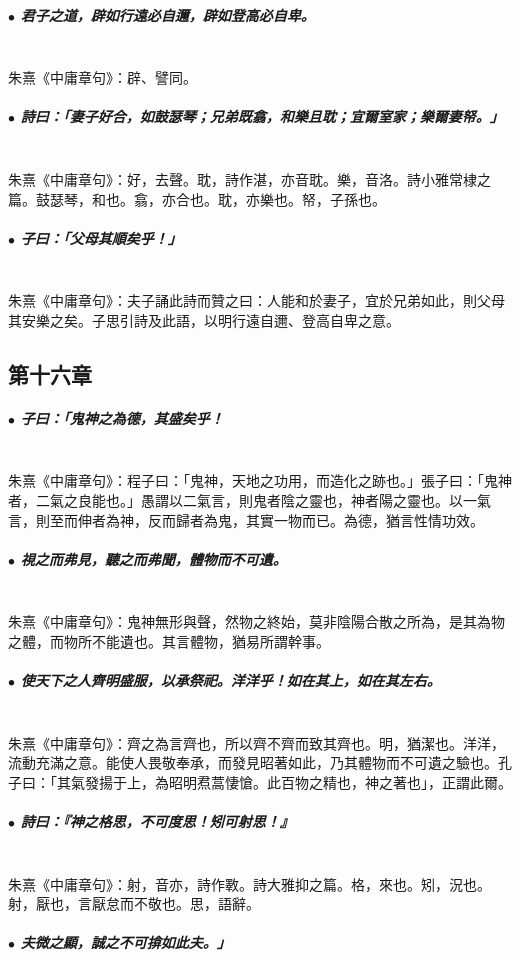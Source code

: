 \documentclass[hyperref, UTF8, 12pt, a4paper]{ctexrep}
\begin{document}
\subparagraph{$\bullet$ 君子之道，辟如行遠必自邇，辟如登高必自卑。} ~\\

朱熹《中庸章句》：辟、譬同。

\subparagraph{$\bullet$ 詩曰：「妻子好合，如鼓瑟琴；兄弟既翕，和樂且耽；宜爾室家；樂爾妻帑。」} ~\\

朱熹《中庸章句》：好，去聲。耽，詩作湛，亦音耽。樂，音洛。詩小雅常棣之篇。鼓瑟琴，和也。翕，亦合也。耽，亦樂也。帑，子孫也。

\subparagraph{$\bullet$ 子曰：「父母其順矣乎！」} ~\\

朱熹《中庸章句》：夫子誦此詩而贊之曰：人能和於妻子，宜於兄弟如此，則父母其安樂之矣。子思引詩及此語，以明行遠自邇、登高自卑之意。

\newpage
\subsection{第十六章}

\subparagraph{$\bullet$ 子曰：「鬼神之為德，其盛矣乎！} ~\\

朱熹《中庸章句》：程子曰：「鬼神，天地之功用，而造化之跡也。」張子曰：「鬼神者，二氣之良能也。」愚謂以二氣言，則鬼者陰之靈也，神者陽之靈也。以一氣言，則至而伸者為神，反而歸者為鬼，其實一物而已。為德，猶言性情功效。

\subparagraph{$\bullet$ 視之而弗見，聽之而弗聞，體物而不可遺。} ~\\

朱熹《中庸章句》：鬼神無形與聲，然物之終始，莫非陰陽合散之所為，是其為物之體，而物所不能遺也。其言體物，猶易所謂幹事。

\subparagraph{$\bullet$ 使天下之人齊明盛服，以承祭祀。洋洋乎！如在其上，如在其左右。} ~\\

朱熹《中庸章句》：齊之為言齊也，所以齊不齊而致其齊也。明，猶潔也。洋洋，流動充滿之意。能使人畏敬奉承，而發見昭著如此，乃其體物而不可遺之驗也。孔子曰：「其氣發揚于上，為昭明焄蒿悽愴。此百物之精也，神之著也」，正謂此爾。

\subparagraph{$\bullet$ 詩曰：『神之格思，不可度思！矧可射思！』} ~\\

朱熹《中庸章句》：射，音亦，詩作斁。詩大雅抑之篇。格，來也。矧，況也。射，厭也，言厭怠而不敬也。思，語辭。

\subparagraph{$\bullet$ 夫微之顯，誠之不可揜如此夫。」} ~\\
\end{document}
